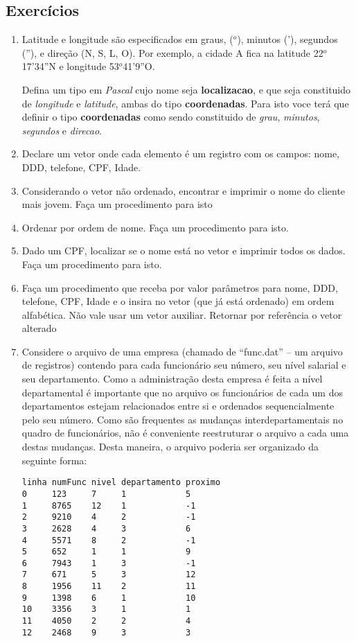 \subsection{Exercícios}

\begin{enumerate}


\item Latitude e longitude s\~ao especificados em graus, ($^{o}$), minutos ('),
segundos (''), e dire\c c\~ao (N, S, L, O). Por exemplo, a cidade A fica
na latitude 22$^{o}$17'34''N e longitude 53$^{o}$41'9''O.

Defina um tipo em \emph{Pascal} 
cujo nome seja {\bf localizacao}, e que seja constituido
de {\em longitude} e {\em latitude}, ambas do tipo {\bf coordenadas}. Para
isto voce ter\'a que definir o tipo {\bf coordenadas} como sendo constituido
de {\em grau}, {\em minutos}, {\em segundos} e {\em direcao}.

\item Declare um vetor onde cada elemento \'e um registro com os campos: nome, DDD, telefone, CPF, Idade.
\item Considerando o vetor n\~ao ordenado, encontrar e imprimir o nome do cliente mais jovem. Fa\c ca um 
procedimento para isto
\item Ordenar por ordem de nome. Fa\c ca um procedimento para isto.
\item Dado um CPF, localizar se o nome est\'a no vetor e imprimir todos os dados. Fa\c ca um procedimento para
isto.
\item Fa\c ca um procedimento que receba por valor par\^ametros para nome, DDD, telefone, CPF, Idade 
e o insira no vetor (que j\'a est\'a ordenado) em ordem alfab\'etica. N\~ao vale usar um vetor auxiliar.
Retornar por refer\^encia o vetor alterado

\item Considere o arquivo de uma empresa (chamado de ``func.dat'' -- um arquivo
de registros) contendo
para cada funcionário seu número, seu nível salarial e seu departamento.
Como a administração desta empresa é feita a nível departamental é
importante que no arquivo os funcionários de cada um dos departamentos
estejam relacionados entre si e ordenados sequencialmente pelo seu número.
Como são frequentes as mudanças interdepartamentais no quadro de
funcionários, não é conveniente reestruturar o arquivo a cada uma destas
mudanças.  Desta maneira, o arquivo poderia ser organizado da seguinte
forma:

\begin{verbatim}
linha numFunc nivel departamento proximo
0     123     7     1            5
1     8765    12    1            -1
2     9210    4     2            -1
3     2628    4     3            6
4     5571    8     2            -1
5     652     1     1            9
6     7943    1     3            -1
7     671     5     3            12
8     1956    11    2            11
9     1398    6     1            10
10    3356    3     1            1
11    4050    2     2            4
12    2468    9     3            3
\end{verbatim}





\end{enumerate}

